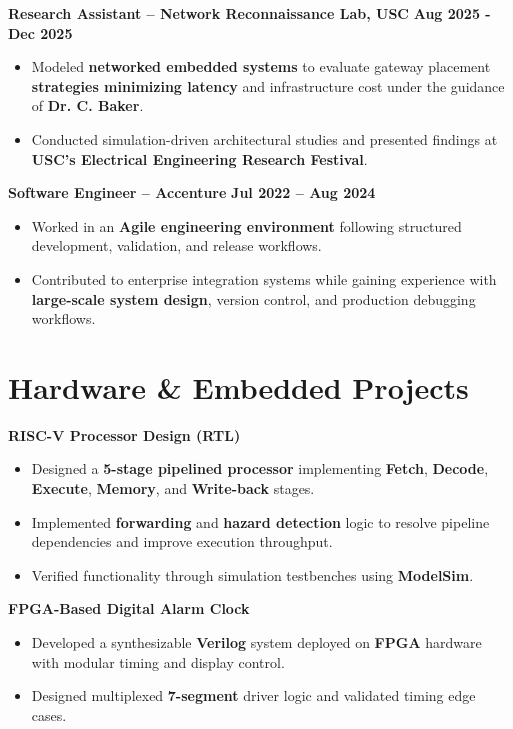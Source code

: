 \documentclass[letterpaper,11pt]{article}
\begin{document}
\textbf{Research Assistant – Network Reconnaissance Lab, USC} \hfill \textbf{Aug 2025 - Dec 2025} \\
\begin{itemize}
\item Modeled \textbf{networked embedded systems} to evaluate gateway placement \textbf{strategies minimizing latency} and infrastructure cost under the guidance of \textbf{Dr. C. Baker}.
\item Conducted simulation-driven architectural studies and presented findings at \textbf{USC’s Electrical Engineering Research Festival}.
\end{itemize}

\textbf{Software Engineer – Accenture} \hfill \textbf{Jul 2022 -- Aug 2024} \\
\begin{itemize}
\item Worked in an \textbf{Agile engineering environment} following structured development, validation, and release workflows.
\item Contributed to enterprise integration systems while gaining experience with \textbf{large-scale system design}, version control, and production debugging workflows.
\end{itemize}


\section*{Hardware \& Embedded Projects}

\textbf{RISC-V Processor Design (RTL)}
\begin{itemize}
\item Designed a \textbf{5-stage pipelined processor} implementing \textbf{Fetch}, \textbf{Decode}, \textbf{Execute}, \textbf{Memory}, and \textbf{Write-back} stages.
\item Implemented \textbf{forwarding} and \textbf{hazard detection} logic to resolve pipeline dependencies and improve execution throughput.
\item Verified functionality through simulation testbenches using \textbf{ModelSim}.
\end{itemize}

\textbf{FPGA-Based Digital Alarm Clock}
\begin{itemize}
\item Developed a synthesizable \textbf{Verilog} system deployed on \textbf{FPGA} hardware with modular timing and display control.
\item Designed multiplexed \textbf{7-segment} driver logic and validated timing edge cases.

\end{itemize}
\end{document}
